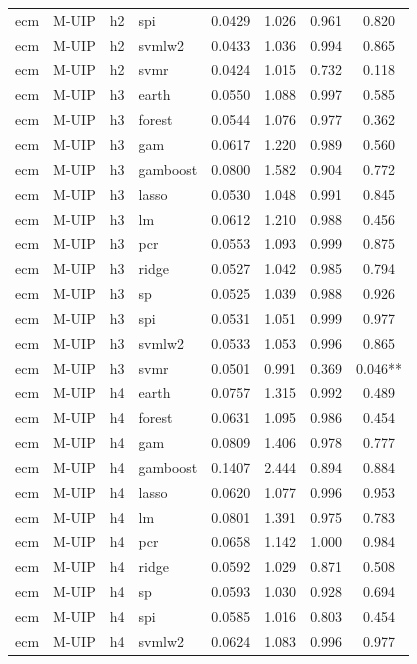 \begin{ThreePartTable}
\begin{longtable}[t]{llclcccc}
ecm & M-UIP & h2 & spi & 0.0429 & 1.026 & 0.961 & 0.820\\
ecm & M-UIP & h2 & svmlw2 & 0.0433 & 1.036 & 0.994 & 0.865\\
ecm & M-UIP & h2 & svmr & 0.0424 & 1.015 & 0.732 & 0.118\\
\addlinespace
ecm & M-UIP & h3 & earth & 0.0550 & 1.088 & 0.997 & 0.585\\
ecm & M-UIP & h3 & forest & 0.0544 & 1.076 & 0.977 & 0.362\\
ecm & M-UIP & h3 & gam & 0.0617 & 1.220 & 0.989 & 0.560\\
ecm & M-UIP & h3 & gamboost & 0.0800 & 1.582 & 0.904 & 0.772\\
ecm & M-UIP & h3 & lasso & 0.0530 & 1.048 & 0.991 & 0.845\\
ecm & M-UIP & h3 & lm & 0.0612 & 1.210 & 0.988 & 0.456\\
ecm & M-UIP & h3 & pcr & 0.0553 & 1.093 & 0.999 & 0.875\\
ecm & M-UIP & h3 & ridge & 0.0527 & 1.042 & 0.985 & 0.794\\
ecm & M-UIP & h3 & sp & 0.0525 & 1.039 & 0.988 & 0.926\\
ecm & M-UIP & h3 & spi & 0.0531 & 1.051 & 0.999 & 0.977\\
ecm & M-UIP & h3 & svmlw2 & 0.0533 & 1.053 & 0.996 & 0.865\\
ecm & M-UIP & h3 & svmr & 0.0501 & 0.991 & 0.369 & 0.046**\\
\addlinespace
ecm & M-UIP & h4 & earth & 0.0757 & 1.315 & 0.992 & 0.489\\
ecm & M-UIP & h4 & forest & 0.0631 & 1.095 & 0.986 & 0.454\\
ecm & M-UIP & h4 & gam & 0.0809 & 1.406 & 0.978 & 0.777\\
ecm & M-UIP & h4 & gamboost & 0.1407 & 2.444 & 0.894 & 0.884\\
ecm & M-UIP & h4 & lasso & 0.0620 & 1.077 & 0.996 & 0.953\\
ecm & M-UIP & h4 & lm & 0.0801 & 1.391 & 0.975 & 0.783\\
ecm & M-UIP & h4 & pcr & 0.0658 & 1.142 & 1.000 & 0.984\\
ecm & M-UIP & h4 & ridge & 0.0592 & 1.029 & 0.871 & 0.508\\
ecm & M-UIP & h4 & sp & 0.0593 & 1.030 & 0.928 & 0.694\\
ecm & M-UIP & h4 & spi & 0.0585 & 1.016 & 0.803 & 0.454\\
ecm & M-UIP & h4 & svmlw2 & 0.0624 & 1.083 & 0.996 & 0.977\\

\end{longtable}
\end{ThreePartTable}
